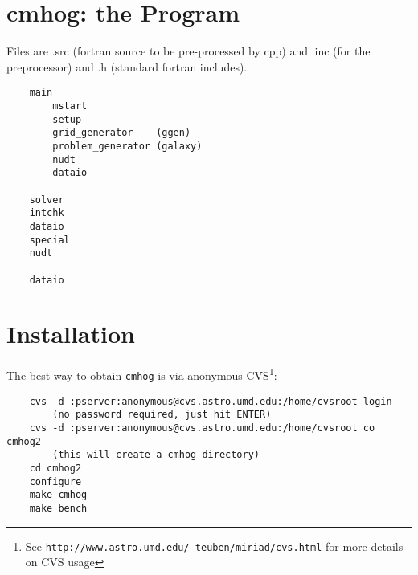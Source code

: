 \documentclass[11pt]{article}
\begin{document}
\section{cmhog: the Program}

Files are .src (fortran source to be pre-processed by cpp) and 
.inc (for the preprocessor) and .h (standard fortran includes).

\begin{verbatim}
    main    
        mstart
	    setup
	    grid_generator    (ggen)
	    problem_generator (galaxy)
	    nudt
        dataio
	
	solver
	intchk
	dataio
	special
	nudt
	
	dataio
\end{verbatim}

\section{Installation}

The best way to obtain {\tt cmhog} is via 
anonymous CVS\footnote{See {\tt http://www.astro.umd.edu/~teuben/miriad/cvs.html}
for more details on CVS usage}: 

\begin{verbatim}
	cvs -d :pserver:anonymous@cvs.astro.umd.edu:/home/cvsroot login
		(no password required, just hit ENTER)
	cvs -d :pserver:anonymous@cvs.astro.umd.edu:/home/cvsroot co cmhog2
		(this will create a cmhog directory)
	cd cmhog2
	configure
	make cmhog
	make bench
\end{verbatim}
\end{document}
